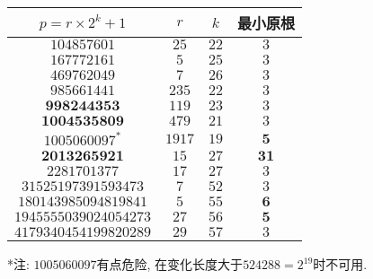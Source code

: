 \begin{tabular}{|c|c|c|c|}
	\hline $p = r \times 2 ^ k + 1$ &  $r$  & $k$  & 最小原根 \\
	\hline $104857601$              &  $25$ & $22$ & $3$ \\
	\hline $167772161$              &  $5$  & $25$ & $3$ \\
     \hline $469762049$      &  $7$   &  $26$  &    $3$ \\
     \hline $985661441$      & $235$  &  $22$  &    $3$ \\
  \hline $\mathbf{998244353}$    & $119$  &  $23$  &    $3$ \\
  \hline $\mathbf{1004535809}$    & $479$  &  $21$  &    $3$ \\
  \hline $1005060097 ^ *$      & $1917$ &  $19$  &  $\mathbf{5}$ \\
  \hline $\mathbf{2013265921}$    &  $15$  &  $27$  &  $\mathbf{31}$ \\
    \hline $2281701377$      &  $17$  &  $27$  &    $3$ \\
 \hline $31525197391593473$  &  $7$   &  $52$  &    $3$ \\
\hline $180143985094819841$  &  $5$   &  $55$  &  $\mathbf{6}$ \\
\hline $1945555039024054273$ &  $27$  &  $56$  &  $\mathbf{5}$ \\
\hline $4179340454199820289$ &  $29$  &  $57$  &    $3$ \\
\hline
\end{tabular}

*注: $1005060097$有点危险, 在变化长度大于$524288 = 2^19$时不可用.